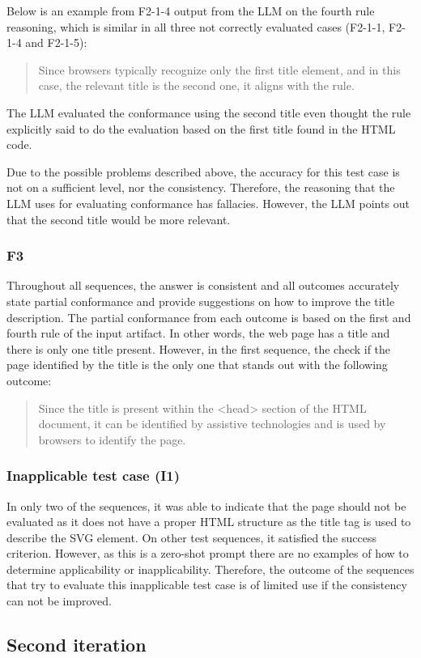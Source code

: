 Below is an example from F2-1-4 output from the LLM on the fourth rule reasoning, which is similar in all three not correctly evaluated cases (F2-1-1, F2-1-4 and F2-1-5): \blockquote{Since browsers typically recognize only the first title element, and in this case, the relevant title is the second one, it aligns with the rule.}. The LLM evaluated the conformance using the second title even thought the rule explicitly said to do the evaluation based on the first title found in the HTML code.

Due to the possible problems described above, the accuracy for this test case is not on a sufficient level, nor the consistency. Therefore, the reasoning that the LLM uses for evaluating conformance has fallacies. However, the LLM points out that the second title would be more relevant.

\subsubsection{F3}

Throughout all sequences, the answer is consistent and all outcomes accurately state partial conformance and provide suggestions on how to improve the title description. The partial conformance from each outcome is based on the first and fourth rule of the input artifact. In other words, the web page has a title and there is only one title present. However, in the first sequence, the check if the page identified by the title is the only one that stands out with the following outcome: \blockquote{Since the title is present within the <head> section of the HTML document, it can be identified by assistive technologies and is used by browsers to identify the page.}

\subsubsection{Inapplicable test case (I1)}

In only two of the sequences, it was able to indicate that the page should not be evaluated as it does not have a proper HTML structure as the title tag is used to describe the SVG element. On other test sequences, it satisfied the success criterion. However, as this is a zero-shot prompt there are no examples of how to determine applicability or inapplicability. Therefore, the outcome of the sequences that try to evaluate this inapplicable test case is of limited use if the consistency can not be improved.

\subsection{Second iteration}

